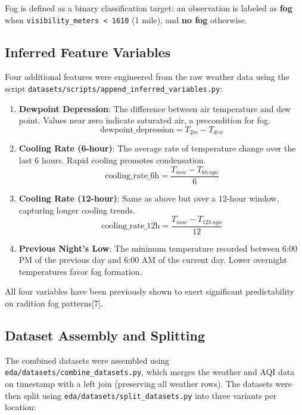 \documentclass[
  letterpaper,
  DIV=11,
  numbers=noendperiod]{scrartcl}
\begin{document}
Fog is defined as a binary classification target: an observation is
labeled as \textbf{fog} when
\texttt{visibility\_meters\ \textless{}\ 1610} (1 mile), and \textbf{no
fog} otherwise.

\subsection{Inferred Feature
Variables}\label{inferred-feature-variables}

Four additional features were engineered from the raw weather data using
the script \texttt{datasets/scripts/append\_inferred\_variables.py}:

\begin{enumerate}
\def\labelenumi{\arabic{enumi}.}
\item
  \textbf{Dewpoint Depression}: The difference between air temperature
  and dew point. Values near zero indicate saturated air, a precondition
  for fog. \[\text{dewpoint\_depression} = T_{2m} - T_{dew}\]
\item
  \textbf{Cooling Rate (6-hour)}: The average rate of temperature change
  over the last 6 hours. Rapid cooling promotes condensation.
  \[\text{cooling\_rate\_6h} = \frac{T_{now} - T_{6h\,ago}}{6}\]
\item
  \textbf{Cooling Rate (12-hour)}: Same as above but over a 12-hour
  window, capturing longer cooling trends.
  \[\text{cooling\_rate\_12h} = \frac{T_{now} - T_{12h\,ago}}{12}\]
\item
  \textbf{Previous Night's Low}: The minimum temperature recorded
  between 6:00 PM of the previous day and 6:00 AM of the current day.
  Lower overnight temperatures favor fog formation.
\end{enumerate}

All four variables have been previously shown to exert significant
predictability on radition fog patterns{[}7{]}.

\subsection{Dataset Assembly and
Splitting}\label{dataset-assembly-and-splitting}

The combined datasets were assembled using
\texttt{eda/datasets/combine\_datasets.py}, which merges the weather and
AQI data on timestamp with a left join (preserving all weather rows).
The datasets were then split using
\texttt{eda/datasets/split\_datasets.py} into three variants per
location:
\end{document}
